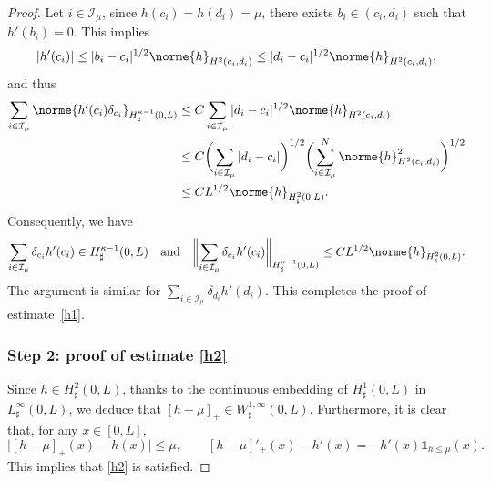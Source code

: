 \begin{proof}
Let $i \in \mathcal I_{\mu}$, since $h(c_{i})=h(d_{i})=\mu$, there exists $b_{i}\in(c_{i},d_{i})$ such that $h'(b_{i})=0$. This implies
\[\vert h'(c_{i})\vert\leq \vert b_{i}-c_{i}\vert^{1/2}\norme{h}_{H^{2}(c_{i},d_{i})} \leq \vert d_{i}-c_{i}\vert^{1/2}\norme{h}_{H^{2}(c_{i},d_{i})},\]
and thus
\begin{equation}\label{regularity.second.derivative}
\begin{aligned}
\sum_{i \in \mathcal I_{\mu}} \norme{h'(c_{i})\delta_{c_{i}}}_{H_\sharp^{\kappa-1}(0,L)}&{}\leq C\sum_{i \in \mathcal I_{\mu}}\vert d_{i}-c_{i}\vert^{1/2}\norme{h}_{H^{2}(c_{i},d_{i})}\\
&\leq C\biggl(\sum_{i \in \mathcal I_{\mu}} \vert d_{i}-c_{i}\vert\biggr)^{1/2}\biggl(\sum_{i \in \mathcal I_{\mu}}^{N}\norme{h}_{H^{2}(c_{i},d_{i})}^{2}\biggr)^{1/2}\\
&\leq CL^{1/2}\norme{h}_{H_\sharp^{2}(0,L)}.
\end{aligned}
\end{equation}
Consequently, we have
\[
\sum_{i\in \mathcal I_{\mu}}\delta_{c_{i} }h{'}(c_{i}) \in H^{\kappa -1}_{\sharp}(0,L) \quad\text{and}\quad \biggl\|\sum_{i\in \mathcal I_{\mu}}\delta_{c_{i} }h{'}(c_{i})\biggr\|_{H^{\kappa -1}_{\sharp}(0,L)} \leq CL^{1/2}\norme{h}_{H_\sharp^{2}(0,L)}.
\]
The argument is similar for $\sum_{i\in \mathcal I_{\mu}}\delta_{d_{i}}h'(d_{i})$. This completes the proof of estimate~\eqref{h1}.

\subsubsection*{Step 2: proof of estimate \eqref{h2}} Since $h\in H_\sharp^2(0, L)$, thanks to the continuous embedding of $H_\sharp^1(0, L)$ in $L_\sharp^\infty(0, L)$, we deduce that $[h-\mu]_{+}\in W_\sharp^{1,\infty}(0, L)$.
Furthermore, it is clear that, for any $ x\in [0, L]$,
\[
\vert [h-\mu]_{+}(x)-h(x)\vert \leq \mu, \qquad [h-\mu]'_{+}(x)-h'(x) = -h'(x) \mathds{1}_{h\leq\mu}(x).
\]
This implies that \eqref{h2} is satisfied.
\end{proof}


